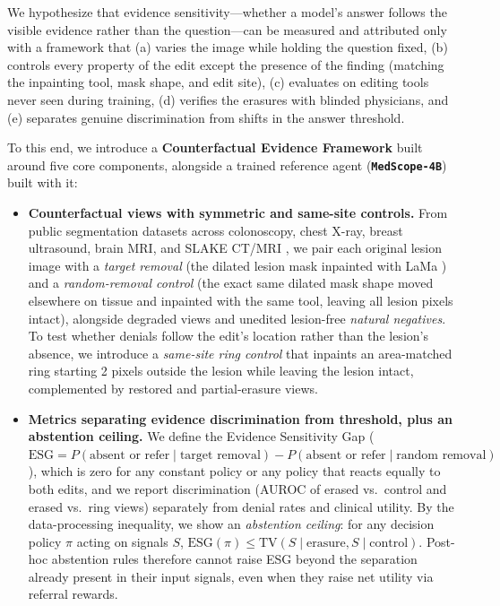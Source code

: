 \documentclass{article} %
\begin{document}
We hypothesize that evidence sensitivity---whether a model's answer follows the visible evidence rather than the question---can be measured and attributed only with a framework that (a) varies the image while holding the question fixed, (b) controls every property of the edit except the presence of the finding (matching the inpainting tool, mask shape, and edit site), (c) evaluates on editing tools never seen during training, (d) verifies the erasures with blinded physicians, and (e) separates genuine discrimination from shifts in the answer threshold.

To this end, we introduce a \textbf{Counterfactual Evidence Framework} built around five core components, alongside a trained reference agent (\textbf{\texttt{MedScope-4B}}) built with it:
\begin{itemize}[leftmargin=*,nosep]
    \item \textbf{Counterfactual views with symmetric and same-site controls.} From public segmentation datasets across colonoscopy, chest X-ray, breast ultrasound, brain MRI, and SLAKE CT/MRI \citep{liu2021slake,jha2020kvasir,borgli2020hyperkvasir,liu2020chestxdet,al2020dataset,buda2019association}, we pair each original lesion image with a \emph{target removal} (the dilated lesion mask inpainted with LaMa \citep{suvorov2022lama}) and a \emph{random-removal control} (the exact same dilated mask shape moved elsewhere on tissue and inpainted with the same tool, leaving all lesion pixels intact), alongside degraded views and unedited lesion-free \emph{natural negatives}. To test whether denials follow the edit's location rather than the lesion's absence, we introduce a \emph{same-site ring control} that inpaints an area-matched ring starting 2 pixels outside the lesion while leaving the lesion intact, complemented by restored and partial-erasure views.
    \item \textbf{Metrics separating evidence discrimination from threshold, plus an abstention ceiling.} We define the Evidence Sensitivity Gap ($\text{ESG} = P(\text{absent or refer} \mid \text{target removal}) - P(\text{absent or refer} \mid \text{random removal})$), which is zero for any constant policy or any policy that reacts equally to both edits, and we report discrimination (AUROC of erased vs.\ control and erased vs.\ ring views) separately from denial rates and clinical utility. By the data-processing inequality, we show an \emph{abstention ceiling}: for any decision policy $\pi$ acting on signals $S$, $\text{ESG}(\pi) \le \text{TV}(S \mid \text{erasure}, S \mid \text{control})$. Post-hoc abstention rules therefore cannot raise ESG beyond the separation already present in their input signals, even when they raise net utility via referral rewards.

\end{itemize}
\end{document}
